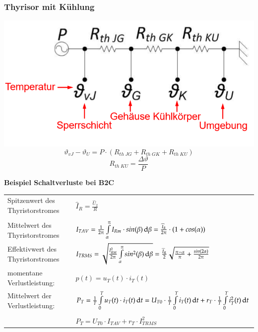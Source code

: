 \begin{multicols}{3}
\begin{minipage}{\linewidth}
		\subsubsection{Thyrisor mit Kühlung}
		\includegraphics[width=\linewidth]{images/thyrMK}
		\[ \vartheta_{vJ}-\vartheta_U=P \cdot (R_{th\; JG}+R_{th\; GK}+R_{th\; KU}) \]	
        \[ R_{th \; KU}=\dfrac{\Delta \vartheta}{P} \]
	\end{minipage}
\end{multicols}
\vspace{-1.5cm}
\textbf{Beispiel Schaltverluste bei B2C}\newline
\begin{tabular}{ll}
    Spitzenwert des Thyristorstromes&
    $\widehat{I}_{R} = \frac{\widehat{U}_{2}}{R}$\\
    \\
    
    Mittelwert des Thyristorstromes &
    $I_{T AV} = \frac{1}{2\pi}\int\limits_{\alpha}^{\pi}I_{Rm} \cdot sin(\beta)\mathop{}\!\mathrm{d}\beta= \frac{\widehat{I}_{R}}{2\pi} \cdot (1+cos(\alpha))$\\

    Effektivwert des Thyristorstromes &
    $I_{T RMS} = \sqrt{\frac{I_{RM}^2}{2\pi}\int\limits_{\alpha}^{\pi}sin^2(\beta)\mathop{}\!\mathrm{d}\beta}= \frac{\widehat{I}_{R}}{2}\sqrt{\frac{\pi - \alpha}{\pi}+\frac{sin(2\alpha)}{2\pi}}$\\

    momentane Verlustleistung:&
    $p(t) = u_{T}(t) \cdot i_{T}(t)$\\
    Mittelwert der Verlustleistung: &
    $P_{T} = \frac{1}{T}\int\limits_{0}^{T}u_{T}(t) \cdot i_{T}(t)\mathop{}\!\mathrm{d} t = U_{T0} \cdot \frac{1}{T}\int\limits_{0}^{T}i_{T}(t)\mathop{}\!\mathrm{d} t+r_{T} \cdot \frac{1}{T}\int\limits_{0}^{T}i_{T}^2(t)\mathop{}\!\mathrm{d} t$\\
    \\
    & $P_{T} = U_{T0} \cdot I_{T AV} + r_{T} \cdot I_{T RMS}^2$\\[0.3cm]
\end{tabular}

